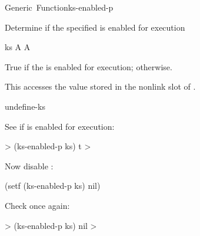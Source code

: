 \documentclass[10pt,twoside,english,pdftex]{article}
\begin{document}
\begin{functiondoc}{Generic~Function}{ks-enabled-p}{ 
    \returns{} }
%

\fnsyntax

\fnpurpose Determine if the specified  is enabled for
execution

\fnsetf
{}

\fnmethods
{}

\fnpackage {}

\fnmodule {}

\fnargs
\begin{args}{ks}
\arg[ks] A 
\arg[boolean] A 
\end{args}

\fnreturns True if the  is enabled for execution; \nil{} otherwise.
  
\fndescription 
This  accesses the value stored in the 
 nonlink slot of .

\begin{alsos}{undefine-ks}
\also[define-ks]
\also[ks]
\also[undefine-ks]
\end{alsos}

\fnexamples
See if   is enabled for execution:
%
\W\supp
\begin{example}
  > (ks-enabled-p ks)
  t
  >
\end{example}
%
Now disable  :
%
\W\supp\notpretop
\begin{example}
  (setf (ks-enabled-p ks) nil)
\end{example}
%
Check once again:
%
\W\supp\notpretop
\begin{example}
  > (ks-enabled-p ks)
  nil
  >
\end{example}

\end{functiondoc}

\end{document}
